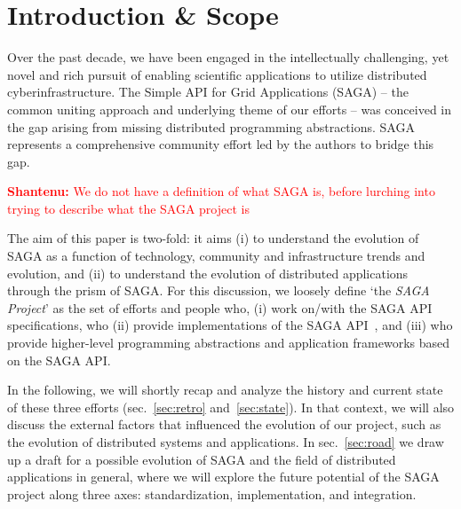 \documentclass{article}
\newcommand{\I}[1]{\textit{#1}}
\newcommand{\B}[1]{\textbf{#1}}
\newcommand{\jhanote}[1]{{\textcolor{red}{     \B{Shantenu:} #1 }}}
\newcommand{\jhanote}[1]{}
\begin{document}
\section{Introduction \& Scope }
\label{sec:intro}

 Over the past decade, we have been engaged in the intellectually
 challenging, yet novel and rich pursuit of enabling scientific
 applications to utilize distributed cyberinfrastructure. The Simple API
 for Grid Applications (SAGA) -- the common uniting approach and
 underlying theme of our efforts -- was conceived in the gap arising
 from missing distributed programming abstractions.  SAGA represents
 a comprehensive community effort led by the authors to bridge this gap.

 \jhanote{We do not have a definition of what SAGA is, before lurching into
   trying to describe what the SAGA project is}

 The aim of this paper is two-fold: it aims (i) to understand the
 evolution of SAGA as a function of technology, community and
 infrastructure trends and evolution, and (ii) to understand the
 evolution of distributed applications through the prism of SAGA.  For
 this discussion, we loosely define `the \I{SAGA Project}' as the set of
 efforts and people who, (i) work on/with the SAGA API
 specifications\cite{ogf-gfd-90}, who (ii) provide implementations of
 the SAGA API~\cite{Kaiser:2006qp,jsaga,javasaga}, and (iii) who provide
 higher-level programming abstractions and application frameworks based
 on the SAGA API\cite{bigjob_cloudcom10,fresh-dag-escience,Sehgal2011590}.

 In the following, we will shortly recap and analyze the history and
 current state of these three efforts (sec.~\ref{sec:retro}
 and~\ref{sec:state}). In that context, we will also discuss the
 external factors that influenced the evolution of our project, such as
 the evolution of distributed systems and applications.  In
 sec.~\ref{sec:road} we draw up a draft for a possible evolution of SAGA
 and the field of distributed applications in general, where we will
 explore the future potential of the SAGA project along three axes:
 standardization, implementation, and integration.
 
\end{document}
